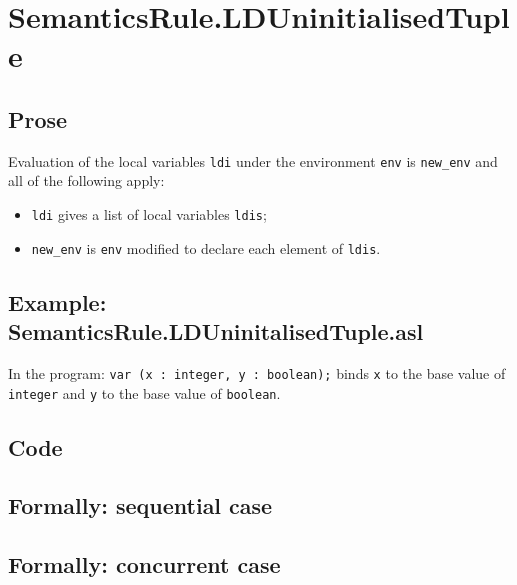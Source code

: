 \documentclass{book}
\begin{document}

\section{SemanticsRule.LDUninitialisedTuple \label{sec:SemanticsRule.LDUninitialisedTuple}}

    \subsection{Prose}
Evaluation of the local variables \texttt{ldi} under the environment
\texttt{env} is \texttt{new\_env} and all of the following apply:
    \begin{itemize}
    \item \texttt{ldi} gives a list of local variables \texttt{ldis};
    \item \texttt{new\_env} is \texttt{env} modified to declare each element of \texttt{ldis}.
    \end{itemize}

    \subsection{Example: SemanticsRule.LDUninitalisedTuple.asl}
    In the program:
   \texttt{var (x : integer, y : boolean);} binds \texttt{x} to the base value of \texttt{integer}
    and \texttt{y} to the base value of \texttt{boolean}.

  \subsection{Code}

\begin{emptyformal}
  \subsection{Formally: sequential case}

  \subsection{Formally: concurrent case}
\end{emptyformal}
\end{document}
